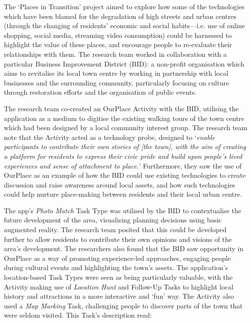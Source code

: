 The `Places in Transition' project aimed to explore how some of the technologies which have been blamed for the degradation of high streets and urban centres (through the changing of residents' economic and social habits---i.e. use of online shopping, social media, streaming video consumption) could be harnessed to highlight the value of these places, and encourage people to re-evaluate their relationships with them. The research team worked in collaboration with a particular Business Improvement District (BID): a non-profit organisation which aims to revitalise its local town centre by working in partnership with local businesses and the surrounding community, particularly focusing on culture through restoration efforts and the organisation of public events.

The research team co-created an OurPlace Activity with the BID, utilising the application as a medium to digitise the existing walking tours of the town centre which had been designed by a local community interest group. The research team note that the Activity acted as a technology probe, designed to `\textit{enable participants to contribute their own stories of [the town], with the aim of creating a platform for residents to express their civic pride and build upon people’s lived experiences and sense of attachment to place.}' Furthermore, they saw the use of OurPlace as an example of how the BID could use existing technologies to create discussion and raise awareness around local assets, and how such technologies could help nurture place-making between residents and their local urban centre.

The app's \textit{Photo Match} Task Type was utilised by the BID to contextualise the future development of the area, visualising planning decisions using basic augmented reality. The research team posited that this could be developed further to allow residents to contribute their own opinions and visions of the area's development. The researchers also found that the BID saw opportunity in OurPlace as a way of promoting experience-led approaches, engaging people during cultural events and highlighting the town's assets. The application's location-based Task Types were seen as being particularly valuable, with the Activity making use of \textit{Location Hunt} and Follow-Up Tasks to highlight local history and attractions in a more interactive and `fun' way. The Activity also used a \textit{Map Marking} Task, challenging people to discover parts of the town that were seldom visited. This Task's description read:

